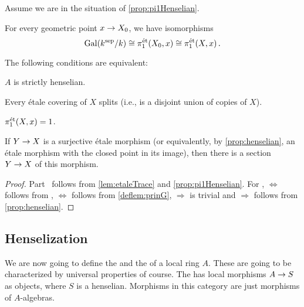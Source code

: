 \documentclass[a4paper, 10pt, oneside, DIV=9, chapterprefix=true, numbers=enddot, bibliography=totoc]{scrbook}
\begin{document}
\begin{cor}
	Assume we are in the situation of \cref{prop:pi1Henselian}.
	\begin{alphanumerate}
		\item For every geometric point $x\morphism X_0$, we have isomorphisms
		\begin{equation*}
			\operatorname{Gal}(k^{\mathrm{sep}}/k)\cong \pi_1^{\mathrm{\acute{e}t}}(X_0,x)\cong \pi_1^{\mathrm{\acute{e}t}}(X,x)\,.
		\end{equation*}
		\item The following conditions are equivalent:
		\begin{numerate}
			\item $A$ is strictly henselian.
			\item Every étale covering of $X$ splits (i.e., is a disjoint union of copies of $X$).
			\item $\pi_1^{\mathrm{\acute{e}t}}(X,x)=1$.
			\item If $Y\morphism X$ is a surjective étale morphism (or equivalently, by \cref{prop:henselian}, an étale morphism with the closed point in its image), then there is a section $Y\morphism X$ of this morphism.
		\end{numerate}
	\end{alphanumerate}
\end{cor}
\begin{proof}
	Part~ follows from \cref{lem:etaleTrace} and \cref{prop:pi1Henselian}. For ,  $\Leftrightarrow$  follows from ,  $\Leftrightarrow$  follows from \cref{deflem:prinG},  $\Rightarrow$  is trivial and  $\Rightarrow$  follows from \cref{prop:henselian}.
\end{proof}
\subsection{Henselization}
We are now going to define the  and the  of a local ring $A$. These are going to be characterized by universal properties of course. The  has local morphisms $A\morphism S$ as objects, where $S$ is a henselian. Morphisms in this category are just morphisms of $A$-algebras.
\end{document}
